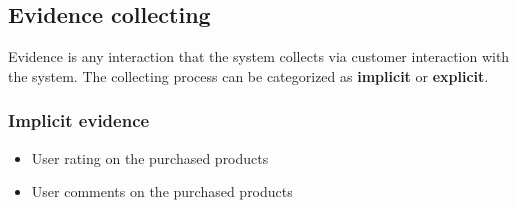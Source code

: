 \subsection{Evidence collecting}
\noindent Evidence is any interaction that the system collects via customer interaction with the system. The collecting process can be categorized as \textbf{implicit} or \textbf{explicit}.

\subsubsection{Implicit evidence}
\begin{itemize}
    \item User rating on the purchased products
    \item User comments on the purchased products
\end{itemize}

